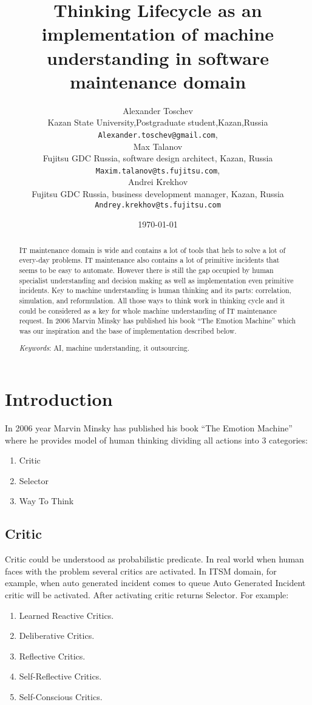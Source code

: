 \documentclass[12pt]{article}
\title{Thinking Lifecycle as an implementation of machine understanding in software maintenance domain}
\author{Alexander Toschev\\
Kazan State University,Postgraduate student,Kazan,Russia\\
\texttt{Alexander.toschev@gmail.com},\\
Max Talanov\\Fujitsu GDC Russia, software design architect, Kazan, Russia\\
\texttt{Maxim.talanov@ts.fujitsu.com},\\
Andrei Krekhov\\
Fujitsu GDC Russia, business development manager, Kazan, Russia\\
\texttt{Andrey.krekhov@ts.fujitsu.com}
}
\date{\today}
\begin{document}
\maketitle

\begin{abstract}
IT maintenance domain is wide and contains a lot of tools that hels to solve a lot of every-day problems. IT maintenance also contains a lot of primitive incidents that seems to be easy to automate. However there is still the gap occupied by human specialist understanding and decision making as well as implementation even primitive incidents. Key to machine understanding is human thinking and its parts: correlation, simulation, and reformulation. All those ways to think work in thinking cycle and it could be considered as a key for whole machine understanding of IT maintenance request. In 2006 Marvin Minsky has published his book “The Emotion Machine” which was our inspiration and the base of implementation described below.

\emph{Keywords}: AI, machine understanding, it outsourcing.

\end{abstract}

\section{Introduction}
In 2006 year Marvin Minsky has published his book “The Emotion Machine” where he provides model of human thinking dividing all actions into 3 categories:

\begin{enumerate}
 \item Critic
 \item Selector
 \item Way To Think
\end{enumerate}

\subsection{Critic}
Critic could be understood as probabilistic predicate. In real world when human faces with the problem several critics are activated. In ITSM domain, for example, when auto generated incident comes to queue Auto Generated Incident critic will be activated. After activating critic returns Selector.
For example:

\begin{enumerate}
 \item Learned Reactive Critics.
 \item Deliberative Critics.
 \item Reflective Critics.
 \item Self-Reflective Critics.
 \item Self-Conscious Critics.
\end{enumerate}
\end{document}

